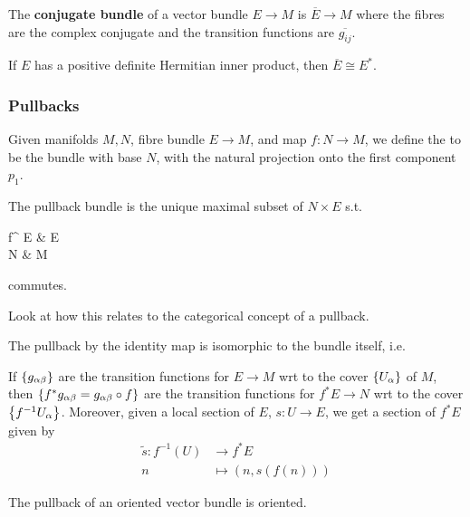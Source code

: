 \documentclass{article}
\begin{document}
\begin{definition}
	The \textbf{conjugate bundle} of a vector bundle $E \to M$ is $\overline{E} \to M$ where the fibres are the complex conjugate and the transition functions are $\overline{g_{ij}}$. 
\end{definition}

\begin{prop}
	If $E$ has a positive definite Hermitian inner product, then $\overline{E} \cong E^\ast$. 
\end{prop}

\subsubsection{Pullbacks}

\begin{definition}
	Given manifolds $M,N$, fibre bundle $E \to M$, and map $f:N \to M$, we define the  to be 
	the bundle with base $N$, with the natural projection onto the first component $p_1$. 
\end{definition}

\begin{lemma}
	The pullback bundle is the unique maximal subset of $N \times E$ s.t. 
	\begin{tkz}
		f^{\ast} E \arrow[r,"p_2"] \arrow[d,"p_1"'] & E \arrow[d,"\pi"] \\
		N \arrow[r,"f"'] & M
	\end{tkz} 
	commutes.
\end{lemma}

\begin{ex}
	Look at how this relates to the categorical concept of a pullback. 
\end{ex}

\begin{example}
	The pullback by the identity map is isomorphic to the bundle itself, i.e. 
\end{example}

\begin{prop}
	If $\left\{ g_{\alpha\beta} \right\}$ are the transition functions for $E\to M$ wrt to the cover $\left\{ U_\alpha \right\}$ of $M$, then $\left\{ f^\ast g_{\alpha\beta} = g_{\alpha\beta}\circ f \right\}$ are the transition functions for $f^\ast E \to N$ wrt to the cover $\left\{ f^{-1}U_\alpha \right\}$. 
	Moreover, given a local section of $E$, $s:U \to E$, we get a section of $f^\ast E$ given by 
	\begin{align*}
		\tilde{s}: f^{-1}(U) &\to f^\ast E \\ 
		n &\mapsto (n, s(f(n))) 
	\end{align*}
\end{prop}
\begin{corollary}
	The pullback of an oriented vector bundle is oriented. 	
\end{corollary}
\end{document}
